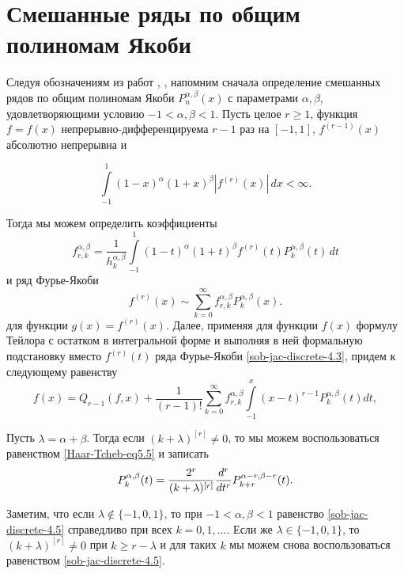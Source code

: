  \section{Смешанные ряды по общим полиномам Якоби}

 Следуя обозначениям из работ \cite{sob-jac-discrete-Shar13},   \cite{sob-jac-discrete-Shar18}, напомним сначала определение смешанных рядов по общим полиномам Якоби
 $P_n^{\alpha,\beta}(x)$ с параметрами $\alpha,\beta$, удовлетворяющими условию
$-1<\alpha,\beta<1$.  Пусть целое $r\ge1$, функция $f=f(x)$ непрерывно-дифференцируема
$r-1$ раз на $[-1,1]$, $f^{(r-1)}(x)$ абсолютно непрерывна и

\begin{equation}\label{sob-jac-discrete-4.1}
\int\limits^1_{-1}(1-x)^\alpha(1+x)^\beta\left|f^{(r)}(x)\right|\,dx<\infty.
\end{equation}

Тогда мы можем определить коэффициенты
\begin{equation}\label{sob-jac-discrete-4.2}
f^{\alpha,\beta}_{r,k}=\frac{1}{h^{\alpha,\beta}_k}\int\limits^1_{-1}(1-t)^\alpha(1+t)^\beta f^{(r)}(t)P_k^{\alpha,\beta}(t)\,dt
\end{equation}
и ряд Фурье-Якоби
\begin{equation}\label{sob-jac-discrete-4.3}
f^{(r)}(x)\sim\sum^\infty_{k=0}f^{\alpha,\beta}_{r,k}P_k^{\alpha,\beta}(x).
\end{equation}
для функции $g(x)=f^{(r)}(x)$. Далее, применяя для функции $f(x)$ формулу Тейлора с остатком в интегральной форме и
выполняя в ней формальную подстановку вместо
$f^{(r)}(t)$ ряда Фурье-Якоби \eqref{sob-jac-discrete-4.3}, придем к следующему равенству
\begin{equation}\label{sob-jac-discrete-4.4}
f(x)=Q_{r-1}(f,x)+\frac{1}{(r-1)!}
\sum^\infty_{k=0}f^{\alpha,\beta}_{r,k}
\int\limits^x_{-1}(x-t)^{r-1}P_k^{\alpha,\beta}(t)dt,
\end{equation}

Пусть $\lambda=\alpha+\beta$. Тогда если $(k+\lambda)^{[r]}\neq0$,
то мы можем воспользоваться равенством \eqref{Haar-Tcheb-eq5.5} и записать
\begin{equation}\label{sob-jac-discrete-4.5}
P^{\alpha,\beta}_k(t)={2^r \over (k+\lambda )^{[r]}}\frac{d^r}{dt^r}P_{k+r}^{\alpha-r,\beta-r}(t).
\end{equation}


Заметим, что если $\lambda\notin\{-1,0,1\}$, то при
$-1<\alpha,\beta<1$ равенство \eqref{sob-jac-discrete-4.5} справедливо при всех
$k=0,1,\ldots$. Если же $\lambda\in\{-1,0,1\}$, то
$(k+\lambda)^{[r]}\neq0$ при $k\ge r-\lambda$ и для таких $k$ мы
можем снова воспользоваться равенством \eqref{sob-jac-discrete-4.5}.

